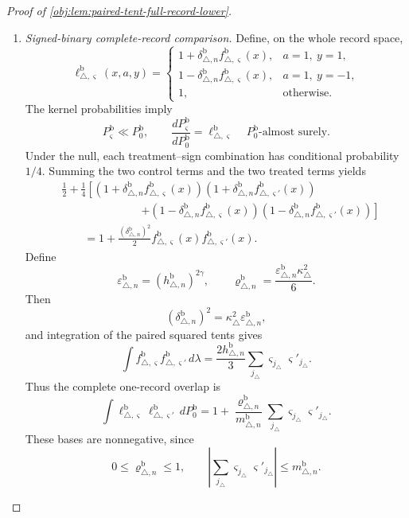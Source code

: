 \documentclass[11pt]{article}
\begin{document}
\begin{proof}[Proof of \cref{obj:lem:paired-tent-full-record-lower}]
\begin{enumerate}
\item \emph{Signed-binary complete-record comparison.}
Define, on the whole record space,
\[
\ell_{\triangle,\varsigma}^{\mathrm b}(x,a,y)=
\begin{cases}
1+\delta_{\triangle,n}^{\mathrm b}
f_{\triangle,\varsigma}^{\mathrm b}(x),&a=1,\ y=1,\\
1-\delta_{\triangle,n}^{\mathrm b}
f_{\triangle,\varsigma}^{\mathrm b}(x),&a=1,\ y=-1,\\
1,&\text{otherwise}.
\end{cases}
\]
The kernel probabilities imply
\[
P_\varsigma^{\mathrm b}\ll P_0^{\mathrm b},
\qquad
\frac{dP_\varsigma^{\mathrm b}}{dP_0^{\mathrm b}}
=\ell_{\triangle,\varsigma}^{\mathrm b}
\quad P_0^{\mathrm b}\text{-almost surely}.
\]
Under the null, each treatment--sign combination has conditional probability
\(1/4\). Summing the two control terms and the two treated terms yields
\[
\begin{aligned}
&\frac12+\frac14
\left[
(1+\delta_{\triangle,n}^{\mathrm b}f_{\triangle,\varsigma}^{\mathrm b}(x))
(1+\delta_{\triangle,n}^{\mathrm b}f_{\triangle,\varsigma'}^{\mathrm b}(x))
\right.\\[-2pt]
&\hspace{3cm}\left.
+
(1-\delta_{\triangle,n}^{\mathrm b}f_{\triangle,\varsigma}^{\mathrm b}(x))
(1-\delta_{\triangle,n}^{\mathrm b}f_{\triangle,\varsigma'}^{\mathrm b}(x))
\right]\\
&\qquad=
1+\frac{(\delta_{\triangle,n}^{\mathrm b})^2}{2}
f_{\triangle,\varsigma}^{\mathrm b}(x)
f_{\triangle,\varsigma'}^{\mathrm b}(x).
\end{aligned}
\]
Define
\[
\varepsilon_{\triangle,n}^{\mathrm b}
=(h_{\triangle,n}^{\mathrm b})^{2\gamma},
\qquad
\varrho_{\triangle,n}^{\mathrm b}
=\frac{\varepsilon_{\triangle,n}^{\mathrm b}\kappa_\triangle^2}{6}.
\]
Then
\[
(\delta_{\triangle,n}^{\mathrm b})^2
=\kappa_\triangle^2\varepsilon_{\triangle,n}^{\mathrm b},
\]
and integration of the paired squared tents gives
\[
\int f_{\triangle,\varsigma}^{\mathrm b}
f_{\triangle,\varsigma'}^{\mathrm b}\,d\lambda
=
\frac{2h_{\triangle,n}^{\mathrm b}}3
\sum_{j_\triangle}
\varsigma_{j_\triangle}\varsigma'_{j_\triangle}.
\]
Thus the complete one-record overlap is
\[
\int
\ell_{\triangle,\varsigma}^{\mathrm b}
\ell_{\triangle,\varsigma'}^{\mathrm b}\,dP_0^{\mathrm b}
=
1+\frac{\varrho_{\triangle,n}^{\mathrm b}}{m_{\triangle,n}^{\mathrm b}}
\sum_{j_\triangle}\varsigma_{j_\triangle}\varsigma'_{j_\triangle}.
\]
These bases are nonnegative, since
\[
0\le\varrho_{\triangle,n}^{\mathrm b}\le1,
\qquad
\left|\sum_{j_\triangle}
\varsigma_{j_\triangle}\varsigma'_{j_\triangle}\right|
\le m_{\triangle,n}^{\mathrm b}.
\]


\end{enumerate}
\end{proof}
\end{document}
